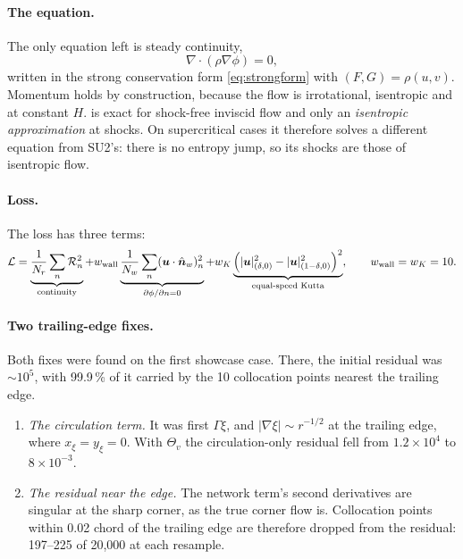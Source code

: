 \documentclass[11pt]{article}
\newcommand{\vu}{\bm{u}}
\begin{document}
\paragraph{The equation.}
The only equation left is steady continuity,
\begin{equation}
  \nabla\cdot(\rho\nabla\phi) = 0,
  \label{eq:fullpot}
\end{equation}
written in the strong conservation form \cref{eq:strongform} with $(F,G) = \rho(u,v)$. Momentum
holds by construction, because the flow is irrotational, isentropic and at constant $H$.
 is exact for shock-free inviscid flow and only an \emph{isentropic approximation}
at shocks. On supercritical cases it therefore solves a different equation from SU2's: there is no
entropy jump, so its shocks are those of isentropic flow.

\paragraph{Loss.}
The loss has three terms:
\begin{equation}
  \mathcal L = \underbrace{\frac{1}{N_r}\sum_{n}\mathcal R_n^2}_{\text{continuity}}
  + w_{\mathrm{wall}}\underbrace{\frac{1}{N_w}\sum_{n}(\vu\cdot\hat{\bm n}_w)^2_n}_{\partial\phi/\partial n = 0}
  + w_K\underbrace{\Bigl(|\vu|^2_{(\delta,0)} - |\vu|^2_{(1-\delta,0)}\Bigr)^2}_{\text{equal-speed Kutta}},
  \qquad w_{\mathrm{wall}} = w_K = 10.
  \label{eq:pinnloss}
\end{equation}

\paragraph{Two trailing-edge fixes.}
Both fixes were found on the first showcase case. There, the initial residual was $\sim10^5$, with
99.9\,\% of it carried by the 10 collocation points nearest the trailing edge.
\begin{enumerate}
  \item \emph{The circulation term.} It was first $\Gamma\xi$, and $|\nabla\xi|\sim r^{-1/2}$ at
    the trailing edge, where $x_\xi = y_\xi = 0$. With $\Theta_v$ the circulation-only residual
    fell from $1.2\times10^4$ to $8\times10^{-3}$.
  \item \emph{The residual near the edge.} The network term's second derivatives are singular at
    the sharp corner, as the true corner flow is. Collocation points within 0.02 chord of the
    trailing edge are therefore dropped from the residual: 197--225 of 20,000 at each resample.
\end{enumerate}
\end{document}

